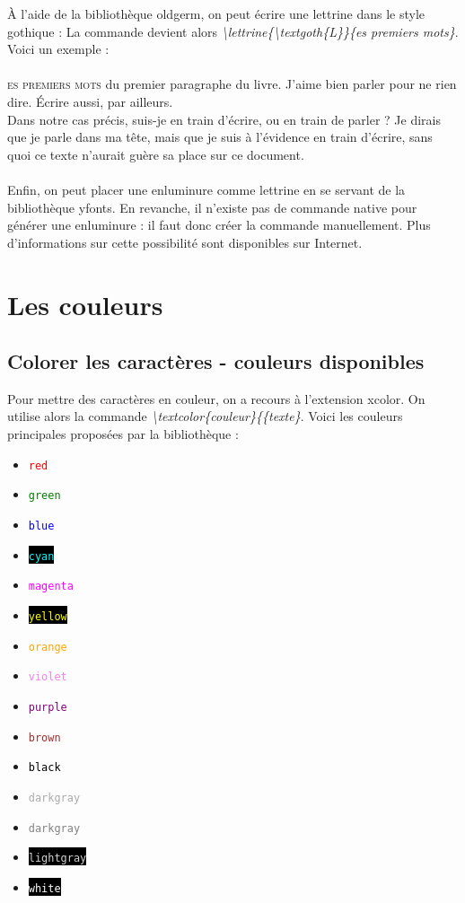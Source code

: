 \documentclass[a4paper, 10pt]{book}
\begin{document}
\pagebreak

À l'aide de la bibliothèque \textsf{oldgerm}, on peut écrire une lettrine dans le style gothique : La commande devient alors \textit{\textbackslash lettrine\{\textbackslash textgoth\{L\}\}\{es premiers mots\}}. Voici un exemple : \\ \\
\lettrine{}{es premiers mots} du premier paragraphe du livre. J'aime bien parler pour ne rien dire. \'Ecrire aussi, par ailleurs. \\Dans notre cas précis, suis-je en train d'écrire, ou en train de parler ? Je dirais que je parle dans ma tête, mais que je suis à l'évidence en train d'écrire, sans quoi ce texte n'aurait guère sa place sur ce document.\\ \\
Enfin, on peut placer une enluminure comme lettrine en se servant de la bibliothèque \textsf{yfonts}. En revanche, il n'existe pas de commande native pour générer une enluminure : il faut donc créer la commande manuellement. Plus d'informations sur cette possibilité sont disponibles sur Internet.

\section{Les couleurs}
\subsection{Colorer les caractères - couleurs disponibles}

Pour mettre des caractères en couleur, on a recours à l'extension \textsf{xcolor}. On utilise alors la commande \textit{\textbackslash 	textcolor\{couleur\}\{\{texte\}}. Voici les couleurs principales proposées par la bibliothèque : 

\begin{itemize}
\item \textcolor{red}{\texttt{red}}
\item \textcolor{green}{\texttt{green}}
\item \textcolor{blue}{\texttt{blue}}
\item \textcolor{cyan}{\colorbox{black}{\texttt{cyan}}}
\item\textcolor{magenta}{\texttt{magenta}}
\item \textcolor{yellow}{\colorbox{black}{\texttt{yellow}}}
\item \textcolor{orange}{\texttt{orange}}
\item \textcolor{violet}{\texttt{violet}}
\item \textcolor{purple}{\texttt{purple}}
\item \textcolor{brown}{\texttt{brown}}
\item \textcolor{black}{\texttt{black}}
\item \textcolor{darkgray}{\texttt{darkgray}}
\item \textcolor{gray}{\texttt{darkgray}}
\item \textcolor{lightgray}{\colorbox{black}{\texttt{lightgray}}}
\item \textcolor{white}{\colorbox{black}{\texttt{white}}}
\end{itemize}
\end{document}
